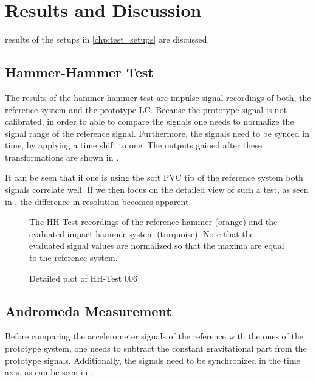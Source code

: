 \chapter{Results and Discussion}
\label{chap:results}

results of the setups in \autoref{chp:test_setups} are discussed.

\section{Hammer-Hammer Test}

The results of the hammer-hammer test are impulse signal recordings of both, the reference system and the prototype \ac{LC}. Because the prototype signal is not calibrated, in order to able to compare the signals one needs to normalize the signal range of the reference signal. Furthermore, the signals need to be synced in time, by applying a time shift to one. The outputs gained after these transformations are shown in .

It can be seen that if one is using the soft PVC tip of the reference system both signals correlate well. If we then focus on the detailed view of such a test, as seen in , the difference in resolution becomes apparent.

\begin{figure}[!htb]
  \centering
  
  \caption[HH-Test comparison]{The HH-Test recordings of the reference hammer (orange) and the evaluated impact hammer system (turquoise). Note that the evaluated signal values are normalized so that the maxima are equal to the reference system.%
    \label{fig:HH_comparison}}
\end{figure}
\begin{figure}[!htb]
  \centering
  
  \caption[HH006 Plot]{Detailed plot of HH-Test 006%
    \label{fig:HH_noise}}
\end{figure}

\section{Andromeda Measurement}
Before comparing the accelerometer signals of the reference with the ones of the prototype system, one needs to subtract the constant gravitational part from the prototype signals. Additionally, the signals need to be synchronized in the time axis, as can be seen in .


